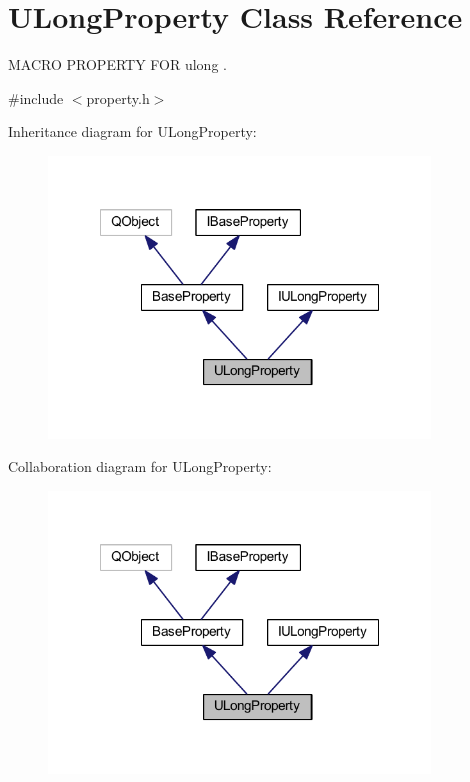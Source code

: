 \hypertarget{class_u_long_property}{\section{U\-Long\-Property Class Reference}
\label{class_u_long_property}
}


M\-A\-C\-R\-O P\-R\-O\-P\-E\-R\-T\-Y F\-O\-R ulong .  




{\ttfamily \#include $<$property.\-h$>$}



Inheritance diagram for U\-Long\-Property\-:
\nopagebreak
\begin{figure}[H]
\begin{center}
\leavevmode
\includegraphics[width=287pt]{class_u_long_property__inherit__graph}
\end{center}
\end{figure}


Collaboration diagram for U\-Long\-Property\-:
\nopagebreak
\begin{figure}[H]
\begin{center}
\leavevmode
\includegraphics[width=287pt]{class_u_long_property__coll__graph}
\end{center}
\end{figure}
